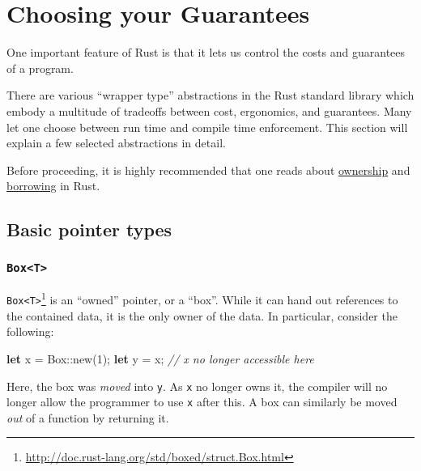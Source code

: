 \documentclass[a4paper,]{book}
\newenvironment{Shaded}{\begin{snugshade}}{\end{snugshade}}
\newcommand{\KeywordTok}[1]{\textcolor[rgb]{0.13,0.29,0.53}{\textbf{{#1}}}}
\newcommand{\DataTypeTok}[1]{\textcolor[rgb]{0.13,0.29,0.53}{{#1}}}
\newcommand{\DecValTok}[1]{\textcolor[rgb]{0.00,0.00,0.81}{{#1}}}
\newcommand{\CommentTok}[1]{\textcolor[rgb]{0.56,0.35,0.01}{\textit{{#1}}}}
\newcommand{\NormalTok}[1]{{#1}}
\renewcommand{\href}[2]{#2\footnote{\url{#1}}}
\begin{document}
\hypertarget{sec--choosing-your-guarantees}{\section{Choosing your
Guarantees}\label{sec--choosing-your-guarantees}}

One important feature of Rust is that it lets us control the costs and
guarantees of a program.

There are various ``wrapper type'' abstractions in the Rust standard
library which embody a multitude of tradeoffs between cost, ergonomics,
and guarantees. Many let one choose between run time and compile time
enforcement. This section will explain a few selected abstractions in
detail.

Before proceeding, it is highly recommended that one reads about
\protect\hyperlink{sec--ownership}{ownership} and
\protect\hyperlink{sec--references-and-borrowing}{borrowing} in Rust.

\subsection{Basic pointer types}\label{basic-pointer-types}

\subsubsection{\texorpdfstring{\texttt{Box\textless{}T\textgreater{}}}{Box\textless{}T\textgreater{}}}\label{boxt}

\href{http://doc.rust-lang.org/std/boxed/struct.Box.html}{\texttt{Box\textless{}T\textgreater{}}}
is an ``owned'' pointer, or a ``box''. While it can hand out references
to the contained data, it is the only owner of the data. In particular,
consider the following:

\begin{Shaded}
\begin{Highlighting}[]
\KeywordTok{let} \NormalTok{x = }\DataTypeTok{Box}\NormalTok{::new(}\DecValTok{1}\NormalTok{);}
\KeywordTok{let} \NormalTok{y = x;}
\CommentTok{// x no longer accessible here}
\end{Highlighting}
\end{Shaded}

Here, the box was \emph{moved} into \texttt{y}. As \texttt{x} no longer
owns it, the compiler will no longer allow the programmer to use
\texttt{x} after this. A box can similarly be moved \emph{out} of a
function by returning it.
\end{document}
